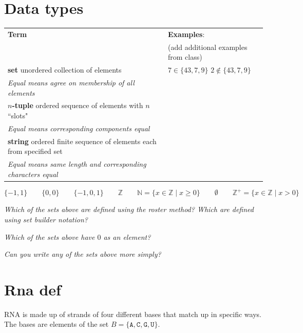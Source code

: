 \documentclass[12pt, oneside]{article}
\newcommand{\A}[0]{\texttt{A}}
\newcommand{\C}[0]{\texttt{C}}
\newcommand{\G}[0]{\texttt{G}}
\newcommand{\U}[0]{\texttt{U}}
\begin{document}
\vfill
 \vfill
\section*{Data types}


\begin{center}
    \begin{tabular}{p{4.4in}p{2.8in}}
    {\bf  Term} & {\bf Examples}:\\
    &  (add additional examples from class)\\
    \hline 
    {\bf set} \newline
    unordered collection of elements & $7 \in \{43, 7, 9 \}$ \qquad $2 \notin \{43, 7, 9 \}$ \\
    {\it Equal means agree on membership of all elements}& \\
    \hline
    {\bf $n$-tuple} \newline
    ordered sequence of elements with $n$ ``slots" & \\
    {\it Equal means corresponding components equal}& \\
    \hline
    {\bf string} \newline
    ordered finite sequence of elements each from specified
    set & \\
    {\it Equal means same length and corresponding characters equal}
    \end{tabular}
    \end{center}
    \[
    \{ -1, 1\} \qquad 
    \{0, 0 \} \qquad
    \{-1, 0, 1 \} \qquad
    \mathbb{Z} \qquad
    \mathbb{N} = \{ x \in \mathbb{Z} \mid x \geq 0 \} \qquad
    \emptyset \qquad
    \mathbb{Z}^+ = \{ x \in \mathbb{Z}  \mid x > 0 \}
    \]
    
    \vfill
    
    {\it Which of the sets above are defined using the roster method? Which are defined using set builder notation?}
    
    {\it Which of the sets above have $0$ as an element?}
    
    {\it Can you write any of the sets above more simply?}
    
    \vfill \vfill
\section*{Rna def}


RNA is made up of strands of four different bases that match up in specific ways.\\
The bases are elements of the set 
$B  = \{\A, \C, \G, \U \}$.
\end{document}
